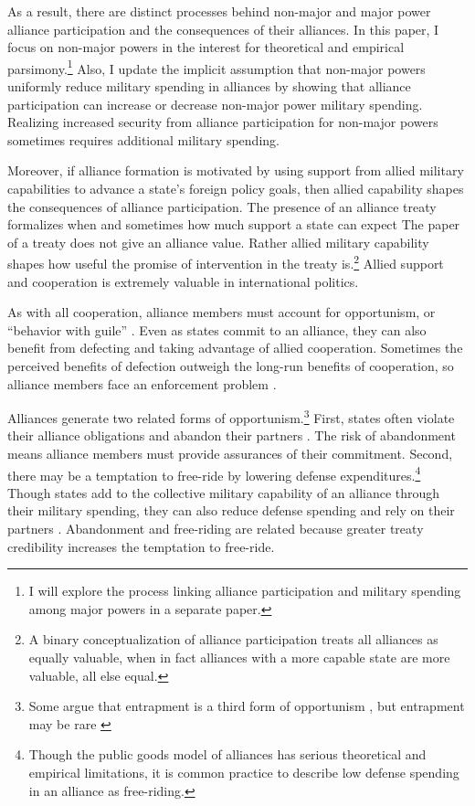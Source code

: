 \documentclass[12pt]{article}
\begin{document}
As a result, there are distinct processes behind non-major and major power alliance participation and the consequences of their alliances. 
In this paper, I focus on non-major powers in the interest for theoretical and empirical parsimony.\footnote{I will explore the process linking alliance participation and military spending among major powers in a separate paper.}
Also, I update the implicit assumption that non-major powers uniformly reduce military spending in alliances by showing that alliance participation can increase or decrease non-major power military spending. 
Realizing increased security from alliance participation for non-major powers sometimes requires additional military spending. 


Moreover, if alliance formation is motivated by using support from allied military capabilities to advance a state's foreign policy goals, then allied capability shapes the consequences of alliance participation. 
The presence of an alliance treaty formalizes when and sometimes how much support a state can expect 
The paper of a treaty does not give an alliance value.
Rather allied military capability shapes how useful the promise of intervention in the treaty is.\footnote{A binary conceptualization of alliance participation treats all alliances as equally valuable, when in fact alliances with a more capable state are more valuable, all else equal.}
Allied support and cooperation is extremely valuable in international politics. 


As with all cooperation, alliance members must account for opportunism, or ``behavior with guile'' \citep{Williamson1985}. 
Even as states commit to an alliance, they can also benefit from defecting and taking advantage of allied cooperation. 
Sometimes the perceived benefits of defection outweigh the long-run benefits of cooperation, so alliance members face an enforcement problem \citep{Fearon1998a, Koremenosetal2001}.


Alliances generate two related forms of opportunism.\footnote{Some argue that entrapment is a third form of opportunism \citep{Snyder1984}, but entrapment may be rare \citep{Kim2011, Beckley2015}}
First, states often violate their alliance obligations and abandon their partners \citep{BerkemeierFuhrmann2018}.
The risk of abandonment means alliance members must provide assurances of their commitment. 
Second, there may be a temptation to free-ride by lowering defense expenditures.\footnote{Though the public goods model of alliances has serious theoretical and empirical limitations, it is common practice to describe low defense spending in an alliance as free-riding.}
Though states add to the collective military capability of an alliance through their military spending, they can also reduce defense spending and rely on their partners \citep{OlsonZeckhauser1966, Morrow1993, Conybeare1994, SandlerHartley2001}.
Abandonment and free-riding are related because greater treaty credibility increases the temptation to free-ride. 
\end{document}
